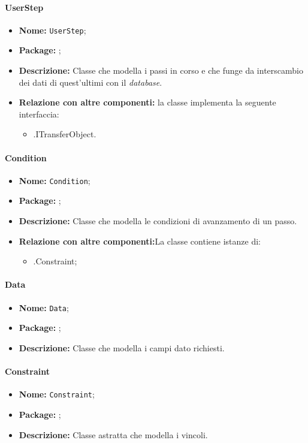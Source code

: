 \paragraph{UserStep}
\begin{itemize}
\item \textbf{Nome:} \texttt{UserStep};
\item \textbf{Package:} \texttt{\smodel{}};
\item \textbf{Descrizione:} Classe che modella i passi in corso e che funge da interscambio dei dati di quest'ultimi con il \textit{database}.
\item \textbf{Relazione con altre componenti:} la classe implementa la seguente interfaccia:
		\begin{itemize}
			\item \smodel{}.ITransferObject.
		\end{itemize}
\end{itemize}

\paragraph{Condition}
\begin{itemize}
\item \textbf{Nome:} \texttt{Condition};
\item \textbf{Package:} \texttt{\smodel{}};
\item \textbf{Descrizione:} Classe che modella le condizioni di avanzamento di un passo.
\item \textbf{Relazione con altre componenti:}La classe contiene istanze di:
		\begin{itemize}
			\item \smodel{}.Constraint;
		\end{itemize}
\end{itemize}

\paragraph{Data}
\begin{itemize}
\item \textbf{Nome:} \texttt{Data};
\item \textbf{Package:} \texttt{\smodel{}};
\item \textbf{Descrizione:} Classe che modella i campi dato richiesti.
\end{itemize}

\paragraph{Constraint}
\begin{itemize}
\item \textbf{Nome:} \texttt{Constraint};
\item \textbf{Package:} \texttt{\smodel{}};
\item \textbf{Descrizione:} Classe astratta che modella i vincoli.
\end{itemize}

